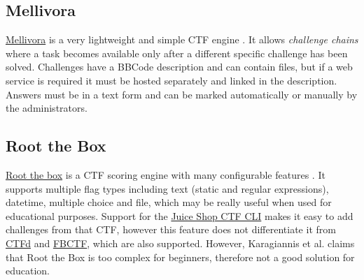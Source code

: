 \subsection{Mellivora}

\href{https://github.com/Nakiami/mellivora}{Mellivora} is a very lightweight and simple CTF engine \cite{bib:Mellivora-GitHub}. It allows \textit{challenge chains} where a task becomes available only after a different specific challenge has been solved. Challenges have a BBCode description and can contain files, but if a web service is required it must be hosted separately and linked in the description. Answers must be in a text form and can be marked automatically or manually by the administrators.

\subsection{Root the Box}

\href{https://github.com/moloch--/RootTheBox}{Root the box} is a CTF scoring engine with many configurable features \cite{bib:RTB-GitHub}. It supports multiple flag types including text (static and regular expressions), datetime, multiple choice and file, which may be really useful when used for educational purposes. Support for the \href{https://github.com/juice-shop/juice-shop-ctf}{Juice Shop CTF CLI} makes it easy to add challenges from that CTF, however this feature does not differentiate it from \hyperref[ssec:CTFd]{CTFd} and \hyperref[ssec:FBCTF]{FBCTF}, which are also supported. However, Karagiannis et al. \cite{bib:CTF-analysis} claims that Root the Box is too complex for beginners, therefore not a good solution for education.

